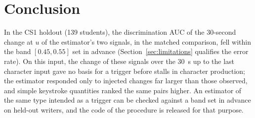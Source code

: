 \section{Conclusion}
\label{sec:conclusion}

In the CS1 holdout (139 students), the discrimination AUC of the 30-second change at $u$ of the estimator's two signals,
in the matched comparison, fell within the band $[0.45, 0.55]$ set in advance (Section~\ref{sec:limitations} qualifies
the error rate). On this input, the change of these signals over the 30~s up to the last character input gave no basis
for a trigger before stalls in character production; the estimator responded only to injected changes far larger than
those observed, and simple keystroke quantities ranked the same pairs higher. An estimator of the same type intended as
a trigger can be checked against a band set in advance on held-out writers, and the code of the procedure is released
for that purpose.
